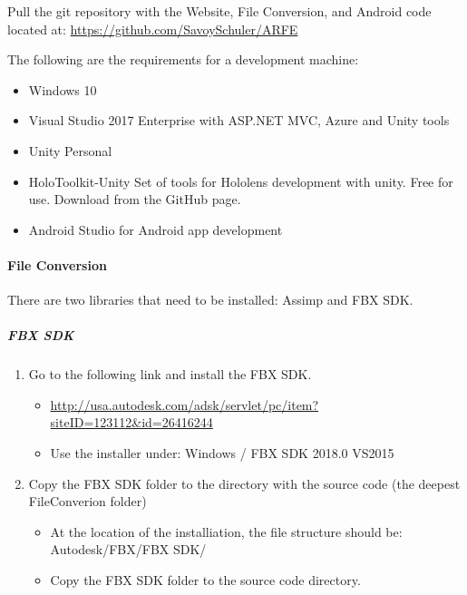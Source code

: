 Pull the git repository with the Website, File Conversion, and Android code located at: \url{https://github.com/SavoySchuler/ARFE}


The following are the requirements for a development machine:
\begin{itemize}
    \item Windows 10
    \item Visual Studio 2017 Enterprise with ASP.NET MVC, Azure and Unity tools
    \item Unity Personal
    \item HoloToolkit-Unity Set of tools for Hololens development with unity. Free for use. Download from the GitHub page.
    \item Android Studio for Android app development
\end{itemize}

\paragraph{File Conversion}

There are two libraries that need to be installed: Assimp and FBX SDK.

\subparagraph{FBX SDK}

\begin{enumerate}
    \item Go to the following link and install the FBX SDK.
    \begin{itemize}
        \item \url{http://usa.autodesk.com/adsk/servlet/pc/item?siteID=123112&id=26416244}
        \item Use the installer under: Windows / FBX SDK 2018.0 VS2015
    \end{itemize}

    \item Copy the FBX SDK folder to the directory with the source code (the deepest FileConverion folder)
    \begin{itemize}
        \item At the location of the installiation, the file structure should be: Autodesk/FBX/FBX SDK/
        \item Copy the FBX SDK folder to the source code directory.
    \end{itemize}
\end{enumerate}

